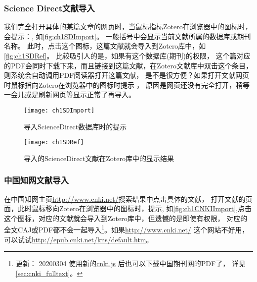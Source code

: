 \documentclass[cn,11pt,chinese]{elegantbook}
\begin{document}
		\subsubsection{Science Direct文献导入}
		我们完全打开具体的某篇文章的网页时，当鼠标指标Zotero在浏览器中的图标时，
		会提示：, 如\autoref{fig:ch1SDImport}。
		一般括号中会显示当前文献所属的数据库或期刊名称。
		此时，点击这个图标，这篇文献就会导入到Zotero库中，如\autoref{fig:ch1SDRef}。
		比较吸引人的是，如果有这个数据库(期刊)的权限，
		这个篇对应的PDF会同时下载下来，而且链接到这篇文献，在Zotero文献库中双击这个条目，
		则系统会自动调用PDF阅读器打开这篇文献，
		是不是很方便？如果打开文献网页时鼠标指向Zotero在浏览器中的图标时提示
		，
		原因是网页还没有完全打开，稍等一会儿或是刷新网页等显示正常了再导入。
		\begin{figure}[htbp]
			\centering
			\texttt{[image: ch1SDImport]}
			\caption{导入ScienceDirect数据库时的提示}
			\label{fig:ch1SDImport}
		\end{figure}
		\begin{figure}
			\centering
			\texttt{[image: ch1SDRef]}
			\caption{导入的ScienceDirect文献在Zotero库中的显示结果}
			\label{fig:ch1SDRef}
		\end{figure}
	\subsubsection{中国知网文献导入} \label{sec:cnki}
	在中国知网主页\url{http://www.cnki.net/}搜索结果中点击具体的文献，
	打开文献的页面，此时鼠标移向Zotero在浏览器中的图标时，提示,
	如\autoref{fig:ch1CNKIImport},点击这个图标，对应的文献就会导入到Zotero库中，但遗憾的是即使有权限，
	对应的全文CAJ或PDF都不会一起导入\footnote{更新：
	20200304 使用新的\href{https://github.com/Zotero-CN/translators_CN}{cnki.js}
	后也可以下载中国期刊网的PDF了，
	详见\cref{sec:cnki_fulltext}。}。如果\url{http://www.cnki.net/}
	这个网站不好用，可以试试\url{http://epub.cnki.net/kns/default.htm}。
\end{document}
